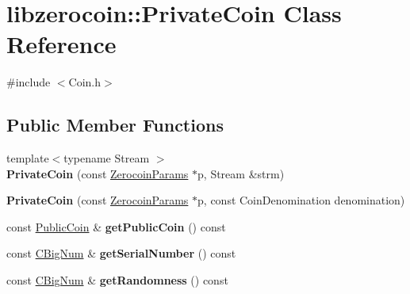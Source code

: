 \hypertarget{classlibzerocoin_1_1_private_coin}{}\section{libzerocoin\+::Private\+Coin Class Reference}
\label{classlibzerocoin_1_1_private_coin}


{\ttfamily \#include $<$Coin.\+h$>$}

\subsection*{Public Member Functions}
\begin{DoxyCompactItemize}
\item 
\mbox{\label{classlibzerocoin_1_1_private_coin_af402bbd2d4e91d4b1c576c18cf769d5b}} 
{\footnotesize template$<$typename Stream $>$ }\\{\bfseries Private\+Coin} (const \mbox{\hyperlink{classlibzerocoin_1_1_zerocoin_params}{Zerocoin\+Params}} $\ast$p, Stream \&strm)
\item 
\mbox{\label{classlibzerocoin_1_1_private_coin_a62fe12639a5a9e520f7bcc15722a1520}} 
{\bfseries Private\+Coin} (const \mbox{\hyperlink{classlibzerocoin_1_1_zerocoin_params}{Zerocoin\+Params}} $\ast$p, const Coin\+Denomination denomination)
\item 
\mbox{\label{classlibzerocoin_1_1_private_coin_ae548bbe6dffd09cdc58860c0f1bfd833}} 
const \mbox{\hyperlink{classlibzerocoin_1_1_public_coin}{Public\+Coin}} \& {\bfseries get\+Public\+Coin} () const
\item 
\mbox{\label{classlibzerocoin_1_1_private_coin_aa0adb0b69df57a41aabec28e91ede86b}} 
const \mbox{\hyperlink{class_c_big_num}{C\+Big\+Num}} \& {\bfseries get\+Serial\+Number} () const
\item 
\mbox{\label{classlibzerocoin_1_1_private_coin_a48bb6b7a80d58e357348c294e9a34b71}} 
const \mbox{\hyperlink{class_c_big_num}{C\+Big\+Num}} \& {\bfseries get\+Randomness} () const
\item 
\mbox{\label{classlibzerocoin_1_1_private_coin_a997f62dcae761e174c2f8b15a3947425}} 

\end{DoxyCompactItemize}
